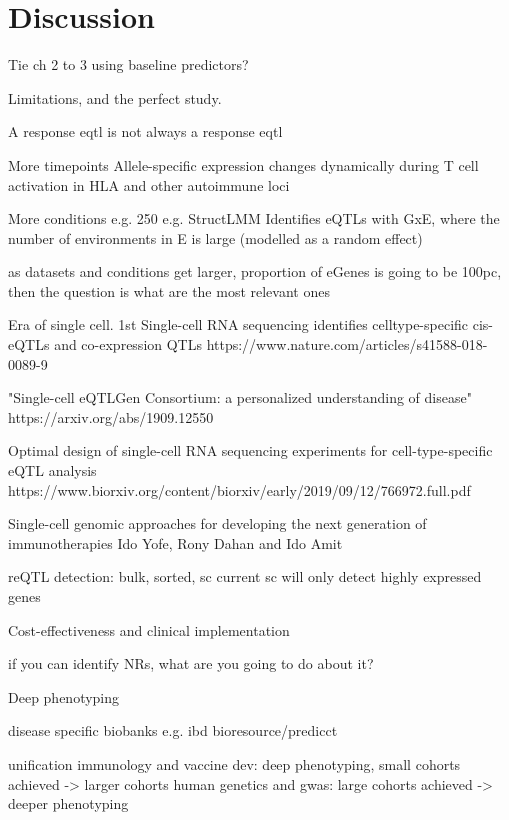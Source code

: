 %
%

\chapter{Discussion}

Tie ch 2 to 3 using baseline predictors?

Limitations, and the perfect study.

A response eqtl is not always a response eqtl

More timepoints
Allele-specific expression changes dynamically during T cell activation in HLA and other autoimmune loci

More conditions
e.g. 250
e.g. StructLMM 
    Identifies eQTLs with GxE, where the number of environments in E is large (modelled as a random effect)

as datasets and conditions get larger, proportion of eGenes is going to be 100pc, then the question is what are the most relevant ones

Era of single cell.
    1st
    Single-cell RNA sequencing identifies celltype-specific cis-eQTLs and co-expression QTLs
    https://www.nature.com/articles/s41588-018-0089-9

    "Single-cell eQTLGen Consortium: a personalized understanding of disease"
    https://arxiv.org/abs/1909.12550

    Optimal design of single-cell RNA sequencing experiments for cell-type-specific eQTL analysis
    https://www.biorxiv.org/content/biorxiv/early/2019/09/12/766972.full.pdf

    Single-cell genomic approaches for developing the next generation of immunotherapies Ido Yofe, Rony Dahan and Ido Amit


    reQTL detection: bulk, sorted, sc
    current sc will only detect highly expressed genes

Cost-effectiveness and clinical implementation

    if you can identify NRs, what are you going to do about it?

Deep phenotyping
    
    disease specific biobanks e.g. ibd bioresource/predicct

unification
    immunology and vaccine dev: deep phenotyping, small cohorts achieved -> larger cohorts
    human genetics and gwas: large cohorts achieved -> deeper phenotyping

